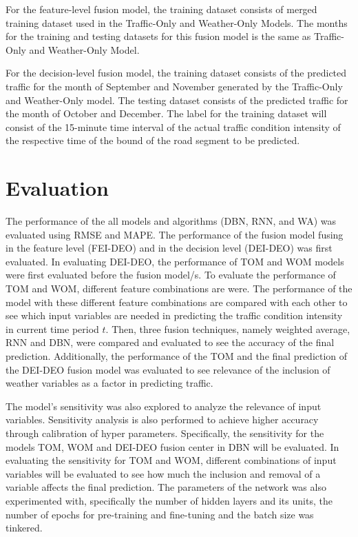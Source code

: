 For the feature-level fusion model, the training dataset consists of merged training dataset used in the Traffic-Only and Weather-Only Models. The months for the training and testing datasets for this fusion model is the same as Traffic-Only and Weather-Only Model. 

For the decision-level fusion model, the training dataset consists of the predicted traffic for the month of September and November generated by the Traffic-Only and Weather-Only model. The testing dataset consists of the predicted traffic for the month of October and December. The label for the training dataset will consist of the 15-minute time interval of the actual traffic condition intensity of the respective time of the bound of the road segment to be predicted. 


\section{Evaluation}
The performance of the all models and algorithms (DBN, RNN, and WA) was evaluated using RMSE and MAPE. The performance of the fusion model fusing in the feature level (FEI-DEO) and in the decision level (DEI-DEO) was first evaluated. In evaluating DEI-DEO, the performance of TOM and WOM models were first evaluated before the fusion model/s. To evaluate the performance of TOM and WOM, different feature combinations are were. The performance of the model with these different feature combinations are compared with each other to see which input variables are needed in predicting the traffic condition intensity in current time period $t$. Then, three fusion techniques, namely weighted average, RNN and DBN, were compared and evaluated to see the accuracy of the final prediction. Additionally, the performance of the TOM and the final prediction of the DEI-DEO fusion model was evaluated to see relevance of the inclusion of weather variables as a factor in predicting traffic. 

The model’s sensitivity was also explored to analyze the relevance of input variables. Sensitivity analysis is also performed to achieve higher accuracy through calibration of hyper parameters. Specifically, the sensitivity for the models TOM, WOM and DEI-DEO fusion center in DBN will be evaluated. In evaluating the sensitivity for TOM and WOM, different combinations of input variables will be evaluated to see how much the inclusion and removal of a variable affects the final prediction. The parameters of the network was also experimented with, specifically the number of hidden layers and its units, the number of epochs for pre-training and fine-tuning and the batch size was tinkered. 


